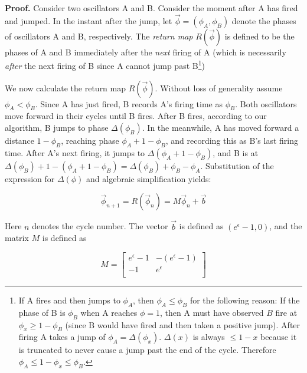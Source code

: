 \documentclass{sig-alternate}
\begin{document}
{{\bf Proof.} Consider two oscillators A and B. Consider the moment
after A has fired and jumped. In the instant after the jump, let
$\vec{\phi} = (\phi_A,\phi_B)$ denote the phases of oscillators A and
B, respectively. The {\em return map} $R(\vec{\phi})$ is defined to be
the phases of A and B immediately after the \emph{next} firing of A
(which is necessarily \emph{after} the next firing of B since A cannot
jump past B\footnote{If A fires and then jumps to $\phi_A$, then
$\phi_A \leq \phi_B$ for the following reason: If the phase of B is
$\phi_B$ when A reaches $\phi=1$, then A must have observed $B$ fire
at $\phi_x \geq 1 - \phi_B$ (since B would have fired and then taken a
positive jump). After firing A takes a jump of
$\phi_A=\Delta(\phi_x)$. $\Delta(x)$ is always $\leq 1-x$ because it
is truncated to never cause a jump past the end of the
cycle. Therefore $\phi_A \leq 1-\phi_x \leq \phi_B$.})

We now calculate the return map $R(\vec{\phi})$. Without loss of
generality assume $\phi_A < \phi_B$. Since A has just fired, B records
A's firing time as $\phi_B$. Both oscillators move forward in their
cycles until B fires. After B fires, according to our algorithm, B
jumps to phase $\Delta(\phi_B)$. In the meanwhile, A has moved forward
a distance $1-\phi_B$, reaching phase $\phi_A+1-\phi_B$, and recording
this as B's last firing time. After A's next firing, it jumps to
$\Delta(\phi_A+1-\phi_B)$, and B is at
$\Delta(\phi_B)+1-(\phi_A+1-\phi_B) =
\Delta(\phi_B)+\phi_B-\phi_A$. Substitution of the expression for
$\Delta(\phi)$ and algebraic simplification yields:

\begin{equation}\label{dynamics}
\vec{\phi}_{n+1}=R(\vec{\phi}_n)=M\vec{\phi}_n+\vec{b}
\end{equation}

Here $n$ denotes the cycle number. The vector $\vec{b}$ is defined as
  $(e^\epsilon-1,0)$, and the matrix $M$ is defined as


\begin{equation}\label{ADefn}
M=
\begin{bmatrix}
  e^\epsilon-1 & -(e^\epsilon-1) \\
  -1 & e^\epsilon \\
\end{bmatrix}
\end{equation}


}
\end{document}
